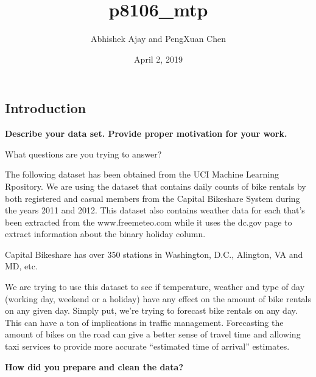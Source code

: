 \documentclass[]{article}
\title{p8106\_mtp}
\author{Abhishek Ajay and PengXuan Chen}
\date{April 2, 2019}
\begin{document}
\maketitle

\subsection{Introduction}\label{introduction}

\textbf{Describe your data set. Provide proper motivation for your
work.}

What questions are you trying to answer?

The following dataset has been obtained from the UCI Machine Learning
Rpository. We are using the dataset that contains daily counts of bike
rentals by both registered and casual members from the Capital Bikeshare
System during the years 2011 and 2012. This dataset also contains
weather data for each that's been extracted from the www.freemeteo.com
while it uses the dc.gov page to extract information about the binary
holiday column.

Capital Bikeshare has over 350 stations in Washington, D.C., Alington,
VA and MD, etc.

We are trying to use this dataset to see if temperature, weather and
type of day (working day, weekend or a holiday) have any effect on the
amount of bike rentals on any given day. Simply put, we're trying to
forecast bike rentals on any day. This can have a ton of implications in
traffic management. Forecasting the amount of bikes on the road can give
a better sense of travel time and allowing taxi services to provide more
accurate ``estimated time of arrival'' estimates.

\textbf{How did you prepare and clean the data?}
\end{document}
